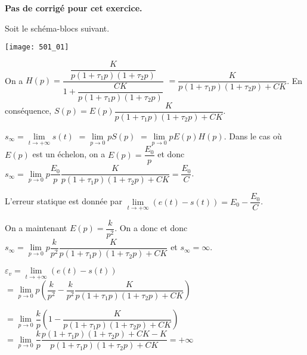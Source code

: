 \normaltrue \difficilefalse \tdifficilefalse
\correctiontrue


\setcounter{numques}{0}

\ifcorrection
\else
\textbf{Pas de corrigé pour cet exercice.}
\fi


\ifprof 
\else
Soit le schéma-blocs suivant.
\begin{center}
\texttt{[image: 501\_01]}
\end{center}
 \fi
 
\ifprof
On a 
$H(p)=\dfrac{\dfrac{K}{p\left(1+\tau_1 p \right)\left(1+\tau_2 p \right)}}{1+\dfrac{CK}{p\left(1+\tau_1 p \right)\left(1+\tau_2 p \right)}}$
$=\dfrac{K}{p\left(1+\tau_1 p \right)\left(1+\tau_2 p \right)+CK}$. 
En conséquence, $S(p)=E(p)\dfrac{K}{p\left(1+\tau_1 p \right)\left(1+\tau_2 p \right)+CK}$.

$s_{\infty}=\lim\limits_{t\to +\infty} s(t)$ $=\lim\limits_{p\to 0} pS(p)$
$=\lim\limits_{p\to 0} pE(p)H(p)$.
Dans le cas où $E(p)$ est un échelon, on a $E(p)=\dfrac{E_0}{p}$ et donc 
$s_{\infty}=\lim\limits_{p\to 0} p\dfrac{E_0}{p}\dfrac{K}{p\left(1+\tau_1 p \right)\left(1+\tau_2 p \right)+CK}=\dfrac{E_0}{C}$.
\else 
\fi

\ifprof
L'erreur statique est donnée par $\lim\limits_{t\to +\infty} (e(t)-s(t))=E_0 - \dfrac{E_0}{C}$.
\else
\fi

\ifprof
On a maintenant $E(p)=\dfrac{k}{p^2}$. 
On a donc et donc 
$s_{\infty}=\lim\limits_{p\to 0} p\dfrac{k}{p^2}\dfrac{K}{p\left(1+\tau_1 p \right)\left(1+\tau_2 p \right)+CK}$ et 
$s_{\infty}=\infty$.

\else 
\fi


\ifprof
$\varepsilon_v = \lim\limits_{t\to +\infty} (e(t)-s(t))$
$=\lim\limits_{p\to 0} p\left(\dfrac{k}{p^2}-\dfrac{k}{p^2}\dfrac{K}{p\left(1+\tau_1 p \right)\left(1+\tau_2 p \right)+CK}\right)$

$=\lim\limits_{p\to 0} \dfrac{k}{p}\left(1-\dfrac{K}{p\left(1+\tau_1 p \right)\left(1+\tau_2 p \right)+CK}\right)$
$=\lim\limits_{p\to 0} \dfrac{k}{p}\dfrac{p\left(1+\tau_1 p \right)\left(1+\tau_2 p \right)+CK-K}{p\left(1+\tau_1 p \right)\left(1+\tau_2 p \right)+CK}=+\infty$
\else
\fi

